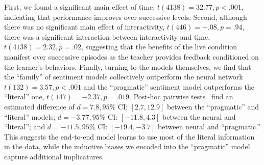 \documentclass[letterpaper]{article} %
\begin{document}
First, we found a significant main effect of time, $t(4138)=32.77, p<.001$, indicating that performance improves over successive levels.
Second, although there was no significant main effect of interactivity, $t(446)=-.08, p=.94$, there was a significant interaction between  interactivity and time, $t(4138)=2.32, p=.02$, suggesting that the benefits of the live condition manifest over successive episodes as the teacher provides feedback conditioned on the learner's behaviors.
Finally, turning to the models themselves, we find that the ``family'' of sentiment models collectively outperform the neural network $t(132)=3.57, p<.001$ and the ``pragmatic'' sentiment model outperforms the ``literal'' one, $t(147)=-2.37, p=.019$.
Post-hoc pairwise tests~\cite{tukey1953section} find an estimated difference of $d = 7.8, 95\%$ CI: $[2.7, 12.9]$ between the ``pragmatic'' and ``literal'' models; $d = -3.77, 95\%$ CI: $[-11.8, 4.3]$ between the neural and ``literal''; and $d = -11.5, 95\%$ CI: $[-19.4, -3.7]$ between neural and ``pragmatic.''
This suggests the end-to-end model learns to use most of the literal information in the data, while the inductive biases we encoded into the ``pragmatic'' model capture additional implicatures.
\vspace{-1.60mm}
\vspace{-3.20mm}
\end{document}
